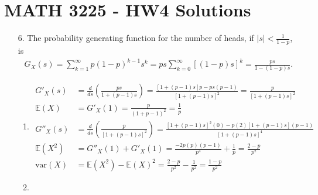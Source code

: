 \documentclass[a4paper,12pt]{article}
\begin{document}
\section*{MATH 3225 - HW4 Solutions}
\begin{enumerate}
    \item[6.] 
        The probability generating function for the number of heads, if $|s| < \frac{1}{1 - p}$, is
        \begin{align*}
            G_X(s) = \sum_{k = 1}^{\infty} p (1 - p)^{k - 1} s^k = ps \sum_{k = 0}^{\infty} [(1 - p)s]^k = \frac{ps}{1 - (1 - p)s}.
        \end{align*}
        \begin{enumerate}
            \item
                \begin{align*}
                    G'_X(s) &= \frac{d}{ds} \left( \frac{ps}{1 + (p - 1)s} \right) = \frac{[1 + (p - 1)s]p - ps(p - 1)}{[1 + (p - 1)s]^2} = \frac{p}{[1 + (p - 1)s]^2} \\
                    \mathbb{E}(X) &= G'_X(1) = \frac{p}{(1 + p - 1)^2} = \frac{1}{p} \\
                    G''_X(s) &= \frac{d}{ds} \left( \frac{p}{[1 + (p - 1)s]^2} \right) = \frac{[1 + (p - 1)s]^2(0) - p(2)[1 + (p - 1)s](p - 1)}{[1 + (p - 1)s]^4} \\
                    \mathbb{E}(X^2) &= G''_X(1) + G'_X(1) = \frac{-2p(p)(p - 1)}{p^4} + \frac{1}{p} = \frac{2 - p}{p^2} \\
                    \text{var}(X) &= \mathbb{E}(X^2) - \mathbb{E}(X)^2 = \frac{2 - p}{p^2} - \frac{1}{p^2} = \frac{1 - p}{p^2}
                \end{align*}

            \item


        \end{enumerate}

\end{enumerate}
\end{document}
